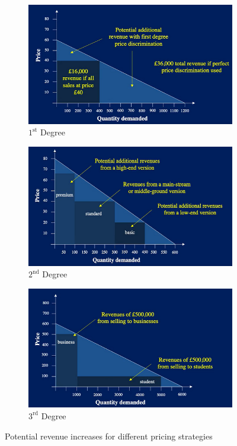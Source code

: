 \documentclass[11pt,a4paper]{article}
\begin{document}
  \begin{figure}[ht!]
    \centering
    \begin{subfigure}[b]{.3\textwidth}
         \centering
         \includegraphics[width=\textwidth]{personalisedPricing.PNG}
         \caption{$1^\text{st}$ Degree}
    \end{subfigure}
    \begin{subfigure}[b]{.3\textwidth}
        \centering
        \includegraphics[width=\textwidth]{versioningPricing.PNG}
        \caption{$2^\text{nd}$ Degree}
    \end{subfigure}
    \begin{subfigure}[b]{.3\textwidth}
         \centering
         \includegraphics[width=\textwidth]{groupPricing.PNG}
         \caption{$3^\text{rd}$ Degree}
     \end{subfigure}
    \caption{Potential revenue increases for different pricing strategies}
    \label{fig_PriceDiscrimination}
  \end{figure}
\end{document}
